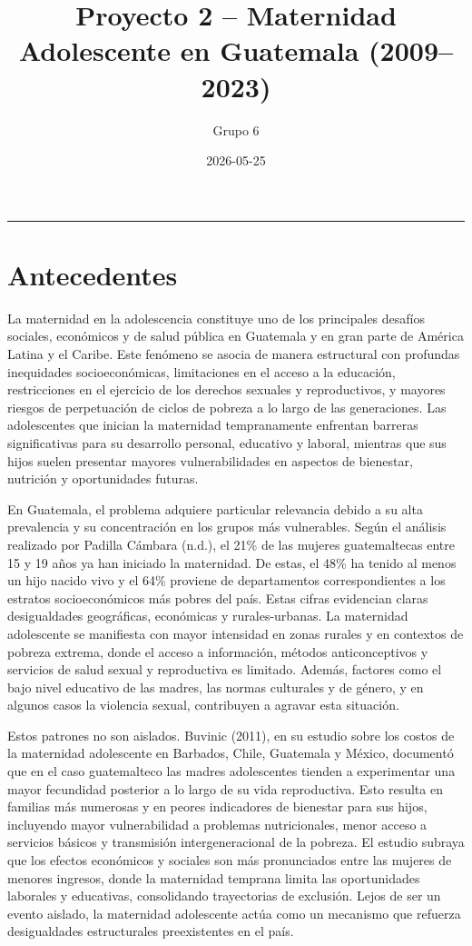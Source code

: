 \documentclass[
]{article}
\title{Proyecto 2 -- Maternidad Adolescente en Guatemala (2009--2023)}
\author{Grupo 6}
\date{2026-05-25}
\begin{document}
\maketitle

{
\setcounter{tocdepth}{2}
\tableofcontents
}
\begin{center}\rule{0.5\linewidth}{0.5pt}\end{center}

\section{Antecedentes}\label{antecedentes}

La maternidad en la adolescencia constituye uno de los principales
desafíos sociales, económicos y de salud pública en Guatemala y en gran
parte de América Latina y el Caribe. Este fenómeno se asocia de manera
estructural con profundas inequidades socioeconómicas, limitaciones en
el acceso a la educación, restricciones en el ejercicio de los derechos
sexuales y reproductivos, y mayores riesgos de perpetuación de ciclos de
pobreza a lo largo de las generaciones. Las adolescentes que inician la
maternidad tempranamente enfrentan barreras significativas para su
desarrollo personal, educativo y laboral, mientras que sus hijos suelen
presentar mayores vulnerabilidades en aspectos de bienestar, nutrición y
oportunidades futuras.

En Guatemala, el problema adquiere particular relevancia debido a su
alta prevalencia y su concentración en los grupos más vulnerables. Según
el análisis realizado por Padilla Cámbara (n.d.), el 21\% de las mujeres
guatemaltecas entre 15 y 19 años ya han iniciado la maternidad. De
estas, el 48\% ha tenido al menos un hijo nacido vivo y el 64\% proviene
de departamentos correspondientes a los estratos socioeconómicos más
pobres del país. Estas cifras evidencian claras desigualdades
geográficas, económicas y rurales-urbanas. La maternidad adolescente se
manifiesta con mayor intensidad en zonas rurales y en contextos de
pobreza extrema, donde el acceso a información, métodos anticonceptivos
y servicios de salud sexual y reproductiva es limitado. Además, factores
como el bajo nivel educativo de las madres, las normas culturales y de
género, y en algunos casos la violencia sexual, contribuyen a agravar
esta situación.

Estos patrones no son aislados. Buvinic (2011), en su estudio sobre los
costos de la maternidad adolescente en Barbados, Chile, Guatemala y
México, documentó que en el caso guatemalteco las madres adolescentes
tienden a experimentar una mayor fecundidad posterior a lo largo de su
vida reproductiva. Esto resulta en familias más numerosas y en peores
indicadores de bienestar para sus hijos, incluyendo mayor vulnerabilidad
a problemas nutricionales, menor acceso a servicios básicos y
transmisión intergeneracional de la pobreza. El estudio subraya que los
efectos económicos y sociales son más pronunciados entre las mujeres de
menores ingresos, donde la maternidad temprana limita las oportunidades
laborales y educativas, consolidando trayectorias de exclusión. Lejos de
ser un evento aislado, la maternidad adolescente actúa como un mecanismo
que refuerza desigualdades estructurales preexistentes en el país.
\end{document}
